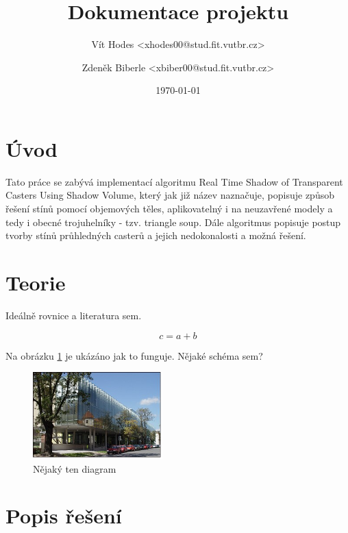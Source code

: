 \documentclass[a4paper, 12pt]{article}
\title{Dokumentace projektu}
\author{Vít Hodes <xhodes00@stud.fit.vutbr.cz>}
\author{Zdeněk Biberle <xbiber00@stud.fit.vutbr.cz>}
\date{\today}
\begin{document}
\maketitle

\section{Úvod}


Tato práce se zabývá implementací algoritmu Real Time Shadow of Transparent Casters Using Shadow
Volume, který jak již název naznačuje, popisuje způsob řešení stínů pomocí objemových těles, aplikovatelný i
na neuzavřené modely a tedy i obecné trojuhelníky - tzv. triangle soup. Dále algoritmus popisuje
postup tvorby stínů průhledných casterů a jejich nedokonalosti a možná řešení.


\section{Teorie}

Ideálně rovnice a literatura sem.


\begin{equation}
  \label{moje-rovnice}
  c = a + b
\end{equation}

Na obrázku \ref{fig:obrazek} je ukázáno jak to funguje. Nějaké schéma sem?

\begin{figure}[htb]
  \centering
  \includegraphics[width=5cm,keepaspectratio]{obrazek.jpg}
  \caption{Nějaký ten diagram}
  \label{fig:obrazek}
\end{figure}


\section{Popis řešení}
\end{document}
